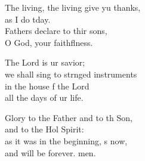 \begin{psalmverse}
\begin{patverse}
The living, the living give yu thanks,\Med\\
as I do tday.\\
Fathers declare to thir sons,\Med\\
O God, your faithflness.

The Lord is ur savior;\Med\\
we shall sing to str\pointup{\i}nged instruments\\
in the house f the Lord\Med\\
all the days of ur life.

Glory to the Father and to th Son,\Med\\
and to the Hol Spirit:\\
as it was in the beginning, \pointup{\i}s now,\Med\\
and will be forever. men. 
  \end{patverse}
\end{psalmverse}
